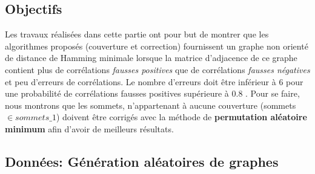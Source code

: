 \subsection{Objectifs}
Les travaux r\'ealis\'ees dans cette partie ont pour but de montrer que les algorithmes propos\'es (couverture et correction) fournissent un graphe non orient\'e de distance de Hamming minimale lorsque la matrice d'adjacence de ce graphe contient plus de corr\'elations {\em fausses positives} que de corr\'elations {\em fausses n\'egatives} et peu d'erreurs de corr\'elations. Le nombre d'erreurs  doit \^etre inf\'erieur \`a $6$ pour une probabilit\'e de corr\'elations {fausses positives} sup\'erieure \`a $0.8$ . 
Pour se faire, nous montrons que les sommets, n'appartenant \`a aucune couverture (sommets $\in sommets\_1$) doivent \^etre corrig\'es avec la m\'ethode de {\bf permutation al\'eatoire minimum} afin d'avoir de meilleurs r\'esultats.

\subsection{Donn\'ees: G\'en\'eration al\'eatoires de graphes} 

